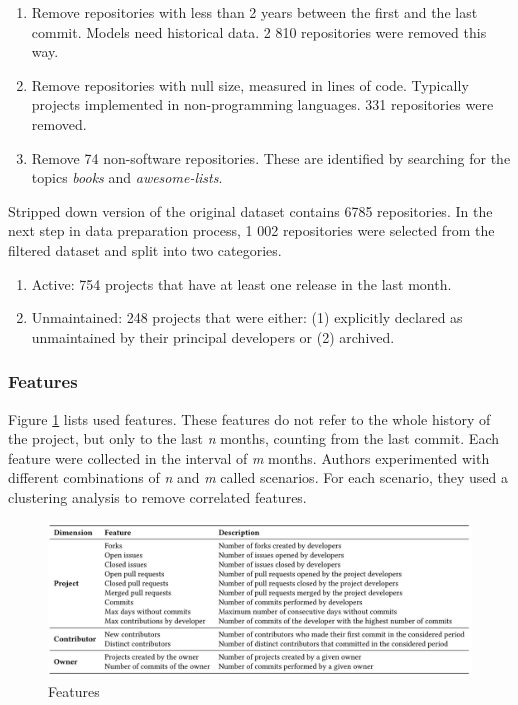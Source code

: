 \begin{enumerate}
    \item Remove repositories with less than 2 years between the first and the last commit.
    Models need historical data.
    2 810 repositories were removed this way.

    \item Remove repositories with null size, measured in lines of code.
    Typically projects implemented in non-programming languages.
    331 repositories were removed.

    \item Remove 74 non-software repositories.
    These are identified by searching for the topics \emph{books} and \emph{awesome-lists}.
\end{enumerate}

Stripped down version of the original dataset contains 6785 repositories.
In the next step in data preparation process, 1 002 repositories were selected from the filtered dataset and split into two categories.

\begin{enumerate}
    \item Active: 754 projects that have at least one release in the last month.

    \item Unmaintained: 248 projects that were either: (1) explicitly declared as unmaintained by their principal developers or (2) archived.
\end{enumerate}

\subsubsection{Features}

Figure \ref{fig:p7-features} lists used features.
These features do not refer to the whole history of the project, but only to the last \emph{n} months, counting from the last commit.
Each feature were collected in the interval of \emph{m} months.
Authors experimented with different combinations of \emph{n} and \emph{m} called scenarios.
For each scenario, they used a clustering analysis to remove correlated features.

\begin{figure}
    \centering
    \includegraphics[scale=0.3]{chapters/chapter1/p7-features.png}
    \caption{Features \cite{p:7}}
    \label{fig:p7-features}
\end{figure}

